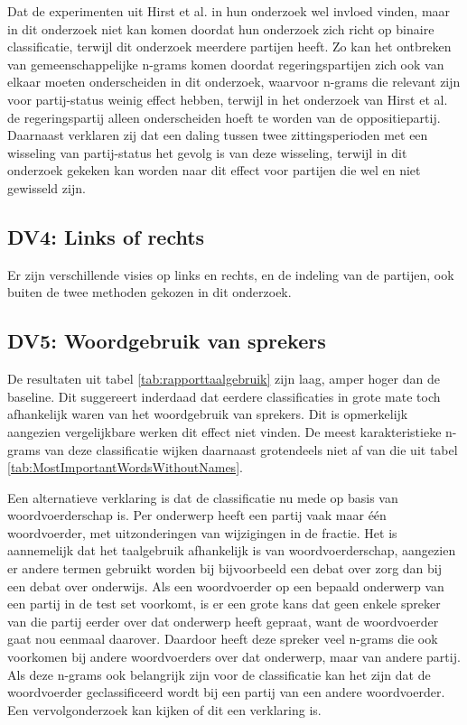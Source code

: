 Dat de experimenten uit Hirst et al. in hun onderzoek wel invloed vinden, maar in dit onderzoek niet kan komen doordat hun onderzoek zich richt op binaire classificatie, terwijl dit onderzoek meerdere partijen heeft. Zo kan het ontbreken van gemeenschappelijke n-grams komen doordat regeringspartijen zich ook van elkaar moeten onderscheiden in dit onderzoek, waarvoor n-grams die relevant zijn voor partij-status weinig effect hebben, terwijl in het onderzoek van Hirst et al. de regeringspartij alleen onderscheiden hoeft te worden van de oppositiepartij. Daarnaast verklaren zij dat een daling tussen twee zittingsperioden met een wisseling van partij-status het gevolg is van deze wisseling, terwijl in dit onderzoek gekeken kan worden naar dit effect voor partijen die wel en niet gewisseld zijn.\par

\subsection{DV4: Links of rechts}
Er zijn verschillende visies op links en rechts, en de indeling van de partijen, ook buiten de twee methoden gekozen in dit onderzoek.\par

\subsection{DV5: Woordgebruik van sprekers}
De resultaten uit tabel \ref{tab:rapporttaalgebruik} zijn laag, amper hoger dan de baseline. Dit suggereert inderdaad dat eerdere classificaties in grote mate toch afhankelijk waren van het woordgebruik van sprekers. Dit is opmerkelijk aangezien vergelijkbare werken dit effect niet vinden. De meest karakteristieke n-grams van deze classificatie wijken daarnaast grotendeels niet af van die uit tabel \ref{tab:MostImportantWordsWithoutNames}.\par
Een alternatieve verklaring is dat de classificatie nu mede op basis van woordvoerderschap is. Per onderwerp heeft een partij vaak maar één woordvoerder, met uitzonderingen van wijzigingen in de fractie. Het is aannemelijk dat het taalgebruik afhankelijk is van woordvoerderschap, aangezien er andere termen gebruikt worden bij bijvoorbeeld een debat over zorg dan bij een debat over onderwijs. Als een woordvoerder op een bepaald onderwerp van een partij in de test set voorkomt, is er een grote kans dat geen enkele spreker van die partij eerder over dat onderwerp heeft gepraat, want de woordvoerder gaat nou eenmaal daarover. Daardoor heeft deze spreker veel n-grams die ook voorkomen bij andere woordvoerders over dat onderwerp, maar van andere partij. Als deze n-grams ook belangrijk zijn voor de classificatie kan het zijn dat de woordvoerder geclassificeerd wordt bij een partij van een andere woordvoerder. Een vervolgonderzoek kan kijken of dit een verklaring is.\par


